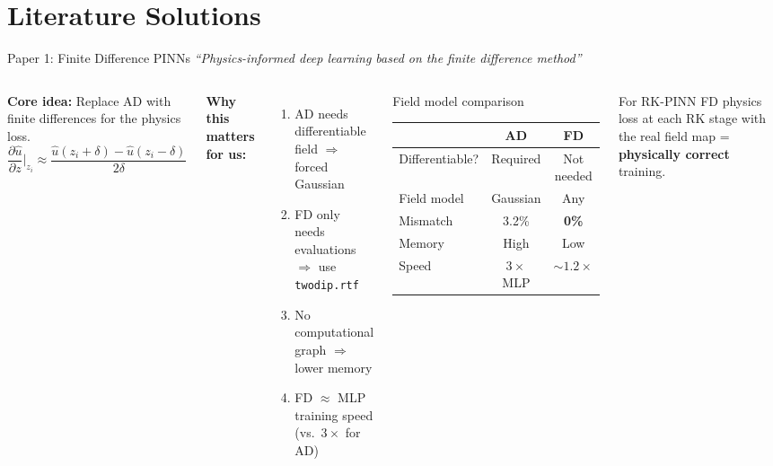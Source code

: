 \documentclass[aspectratio=169, 11pt]{beamer}
\begin{document}
\section{Literature Solutions}

\begin{frame}{Paper 1: Finite Difference PINNs}
  \textit{``Physics-informed deep learning based on the finite difference method''}

  \begin{columns}[T]
    \textbf{Core idea:} Replace AD with finite differences for the physics loss.
    \[
      \frac{\partial \hat{u}}{\partial z}\bigg|_{z_i} \approx \frac{\hat{u}(z_i + \delta) - \hat{u}(z_i - \delta)}{2\delta}
    \]

    \textbf{Why this matters for us:}
    \begin{enumerate}\setlength{\itemsep}{1pt}
      \item AD needs differentiable field $\Rightarrow$ forced Gaussian
      \item FD only needs evaluations $\Rightarrow$ use \texttt{twodip.rtf}
      \item No computational graph $\Rightarrow$ lower memory
      \item FD $\approx$ MLP training speed (vs.\ $3\times$ for AD)
    \end{enumerate}

    \begin{block}{Field model comparison}
      \centering\small
      \begin{tabular}{lcc}
        \toprule
        & \textbf{AD} & \textbf{FD} \\
        \midrule
        Differentiable? & Required & Not needed \\
        Field model & Gaussian & Any \\
        Mismatch & 3.2\% & \textbf{0\%} \\
        Memory & High & Low \\
        Speed & $3\times$ MLP & ${\sim}1.2\times$ \\
        \bottomrule
      \end{tabular}
    \end{block}

    \begin{exampleblock}{For RK-PINN}
      FD physics loss at each RK stage with the real field map = \textbf{physically correct} training.
    \end{exampleblock}
  \end{columns}
\end{frame}
\end{document}
